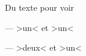 \documentclass{scrartcl}
\newcommand*\mynew[2][un]{ >#1< et >#2<}
\begin{document}
Du texte pour voir

--- \mynew{un}

--- \mynew[deux]{un}
\end{document}
